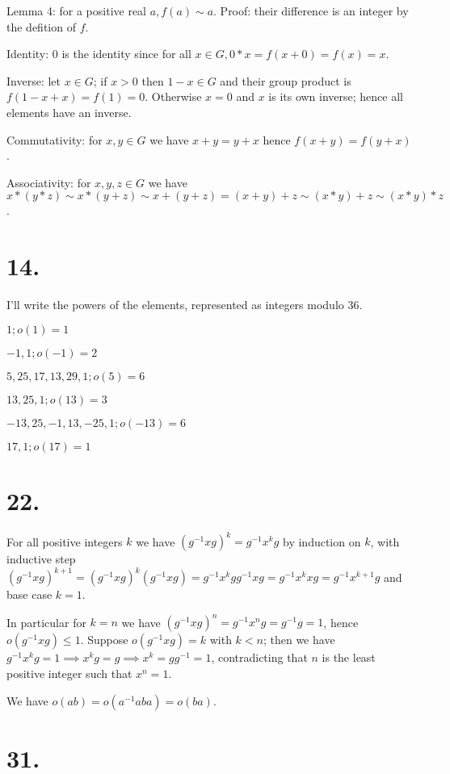 \documentclass{article}
\begin{document}
Lemma 4: for a positive real $a, f(a) \sim a$. Proof: their difference is an integer by the defition of $f$.

Identity: $0$ is the identity since for all $x \in G, 0*x = f(x+0) = f(x) = x$.

Inverse: let $x \in G$; if $x > 0$ then $1-x \in G$ and their group product is $f(1-x+x) = f(1) = 0$. Otherwise $x = 0$ and $x$ is its own inverse; hence all elements have an inverse.

Commutativity: for $x, y \in G$ we have $x+y = y+x$ hence $f(x+y) = f(y+x)$.

Associativity: for $x, y, z \in G$ we have $x*(y*z) \sim x*(y+z) \sim x+(y+z) = (x+y)+z \sim (x*y)+z \sim (x*y)*z$.

\section*{14.}

I'll write the powers of the elements, represented as integers modulo $36$.

$1; o(1)=1$ 

$-1, 1; o(-1) = 2$

$5, 25, 17, 13, 29, 1; o(5) = 6$

$13, 25, 1; o(13) = 3$

$-13, 25, -1, 13, -25, 1; o(-13) = 6$

$17, 1; o(17) = 1$

\section*{22.}

For all positive integers $k$ we have $(g^{-1}xg)^k = g^{-1}x^kg$ by induction on $k$, with inductive step $(g^{-1}xg)^{k+1} = (g^{-1}xg)^k (g^{-1}xg) = g^{-1}x^kg g^{-1}xg = g^{-1}x^kxg = g^{-1}x^{k+1}g$ and base case $k=1$.

In particular for $k=n$ we have $(g^{-1}xg)^n = g^{-1}x^ng = g^{-1}g = 1$, hence $o(g^{-1}xg) \le 1$. Suppose $o(g^{-1}xg) = k$ with $k < n$; then we have $g^{-1}x^kg = 1 \implies x^k g = g \implies x^k = g g^{-1} = 1$, contradicting that $n$ is the least positive integer such that $x^n = 1$.

We have $o(ab) = o(a^{-1}aba) = o(ba)$.

\section*{31.}
\end{document}
